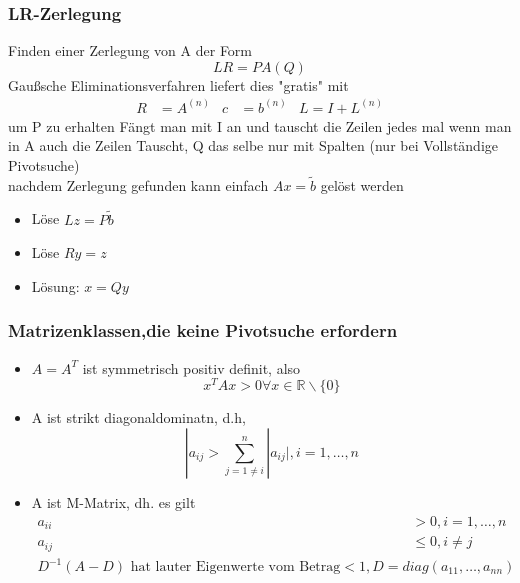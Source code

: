 \documentclass[
	ngerman,
	accentcolor=9c,%
	type=intern,
	marginpar=false
	]{tudapub}
\begin{document}
        \subsubsection{LR-Zerlegung}
            Finden einer Zerlegung von A der Form
            \begin{equation*}
                LR = PA(Q)
            \end{equation*}
            Gaußsche Eliminationsverfahren liefert dies "gratis" mit
            \begin{align*}
                R &= A^{(n)} & c &= b^{(n)} & L = I + L^{(n)}
            \end{align*}
            um P zu erhalten Fängt man mit I an und tauscht die Zeilen jedes mal wenn man in A auch die Zeilen Tauscht, Q das selbe nur mit Spalten (nur bei Vollständige Pivotsuche) \\
            nachdem Zerlegung gefunden kann einfach $Ax = \tilde{b}$ gelöst werden
            \begin{itemize}
                \item Löse $Lz = P\tilde{b}$
                \item Löse $Ry = z$
                \item Lösung: $x=Qy$
            \end{itemize}
        \subsubsection{Matrizenklassen,die keine Pivotsuche erfordern}
            \begin{itemize}
                \item $A=A^T$ ist symmetrisch positiv definit, also
                \begin{equation*}
                    x^TAx>0 \forall x \in \mathbb{R} \backslash \{0\}
                \end{equation*}
                \item A ist strikt diagonaldominatn, d.h,
                \begin{equation*}
                    |a_{ij} > \sum_{j=1\not=i}^n|a_{ij}|, i= 1,\dots,n
                \end{equation*}
                
                \item  A ist M-Matrix, dh. es gilt
                \begin{align*}
                    a_{ii} &> 0, i = 1,\dots,n\\
                    a_{ij} &\leq 0, i \not= j\\
                    D^{-1}(A-D) \text{ hat lauter Eigenwerte vom Betrag} < 1, D=diag(a_{11},\dots,a_{nn})
                \end{align*}
            \end{itemize}
\end{document}
